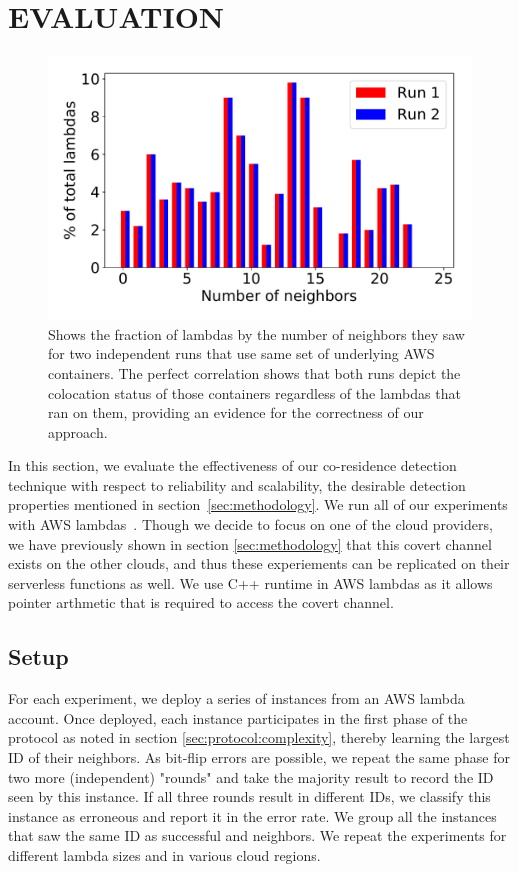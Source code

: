 \section{EVALUATION}
\label{sec:eval}

\begin{figure}[!t]
  \includegraphics[width=.99\linewidth]{fig/correlation.pdf}
  \caption{Shows the fraction of lambdas by the number of neighbors they saw for two 
  independent runs that use same set of underlying AWS containers. The perfect correlation 
  shows that both runs depict the colocation status of those containers regardless of the 
  lambdas that ran on them, providing an evidence for the correctness of our approach.
\label{fig:correlation}}
\end{figure}

In this section, we evaluate the effectiveness of our co-residence detection
technique with respect to reliability and scalability, the desirable detection
properties mentioned in section~\ref{sec:methodology}.  We run all of our
experiments with AWS lambdas~\cite{awscloud}. Though we decide to focus on one
of the cloud providers, we have previously shown in section \ref{sec:methodology} 
that this covert channel exists on the other clouds, and thus these experiements can be
replicated on their serverless functions as well. We use C++ runtime in AWS 
lambdas as it allows pointer arthmetic that is required to access the covert channel.

\subsection{Setup}
\label{subsec:expsetup}
For each experiment, we deploy a series of instances from an AWS lambda
account. Once deployed, each instance participates in the first phase of the
protocol as noted in section \ref{sec:protocol:complexity}, thereby learning the
largest ID of their neighbors. As bit-flip errors are possible, we repeat the
same phase for two more (independent) "rounds" and take the majority result to
record the ID seen by this instance.  If all three rounds result in different
IDs, we classify this instance as erroneous and report it in the error rate. We
group all the instances that saw the same ID as successful and neighbors. We
repeat the experiments for different lambda sizes and in various cloud regions.


